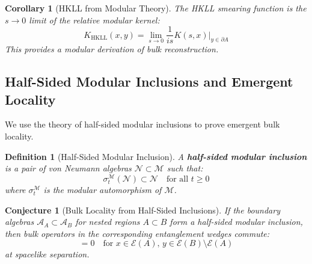 \documentclass[12pt,a4paper]{article}
\newtheorem{conjecture}[theorem]{Conjecture}
\newtheorem{definition}[theorem]{Definition}
\newtheorem{corollary}[theorem]{Corollary}
\begin{document}
\begin{corollary}[HKLL from Modular Theory]
The HKLL smearing function is the $s \to 0$ limit of the relative modular kernel:
\begin{equation}
K_{\text{HKLL}}(x, y) = \lim_{s \to 0} \frac{1}{is} K(s, x)|_{y \in \partial A}
\end{equation}
This provides a modular derivation of bulk reconstruction.
\end{corollary}

\subsection{Half-Sided Modular Inclusions and Emergent Locality}

We use the theory of half-sided modular inclusions to prove emergent bulk locality.

\begin{definition}[Half-Sided Modular Inclusion]
A \textbf{half-sided modular inclusion} is a pair of von Neumann algebras $\mathcal{N} \subset \mathcal{M}$ such that:
\begin{equation}
\sigma_t^{\mathcal{M}}(\mathcal{N}) \subset \mathcal{N} \quad \text{for all } t \geq 0
\end{equation}
where $\sigma_t^{\mathcal{M}}$ is the modular automorphism of $\mathcal{M}$.
\end{definition}

\begin{conjecture}[Bulk Locality from Half-Sided Inclusions]
If the boundary algebras $\mathcal{A}_A \subset \mathcal{A}_B$ for nested regions $A \subset B$ form a half-sided modular inclusion, then bulk operators in the corresponding entanglement wedges commute:
\begin{equation}
[\phi(x), \phi(y)] = 0 \quad \text{for } x \in \mathcal{E}(A), \, y \in \mathcal{E}(B) \setminus \mathcal{E}(A)
\end{equation}
at spacelike separation.
\end{conjecture}
\end{document}
